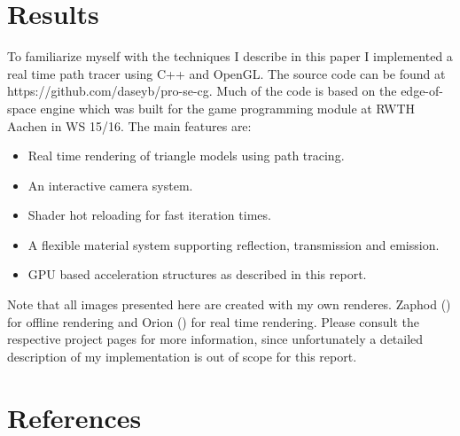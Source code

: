 \documentclass{ACGSeminar}
\begin{document}
\section{Results} \label{results}
To familiarize myself with the techniques I describe in this paper I implemented a real time path tracer using C++ and OpenGL. The source code can be found at https://github.com/daseyb/pro-se-cg.
Much of the code is based on the edge-of-space engine \cite{edge_of_space} which was built for the game programming module at RWTH Aachen in WS 15/16.
The main features are:
\begin{itemize}
\item Real time rendering of triangle models using path tracing.
\item An interactive camera system.
\item Shader hot reloading for fast iteration times.
\item A flexible material system supporting reflection, transmission and emission.
\item GPU based acceleration structures as described in this report.
\end{itemize}
Note that all images presented here are created with my own renderes. Zaphod (\cite{Zaphod}) for offline rendering and Orion (\cite{Orion}) for real time rendering. Please consult the respective project pages for more information, since unfortunately a detailed description of my implementation is out of scope for this report.
\section{References}
\printbibliography
\end{document}
